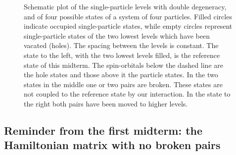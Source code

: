 \documentclass[prc]{revtex4}
\begin{document}
\begin{figure}[htbp]
\centering
{}
\caption{Schematic plot of the single-particle levels with double
  degeneracy, and of four possible states of a system of four
  particles. Filled circles indicate occupied single-particle states,
  while empty circles represent single-particle states of the two
  lowest levels which have been vacated (holes). The spacing between
  the levels is constant. The state to the left, with the two lowest
  levels filled, is the reference state of this midterm. The
  spin-orbitals below the dashed line are the hole states and those
  above it the particle states. In the two states in the middle one or
  two pairs are broken. These states are not coupled to the reference
  state by our interaction. In the state to the right both pairs have
  been moved to higher levels. \label{fig:schematic}}
\end{figure}

\subsection*{Reminder from the first midterm: the Hamiltonian matrix with no broken pairs}
\end{document}
